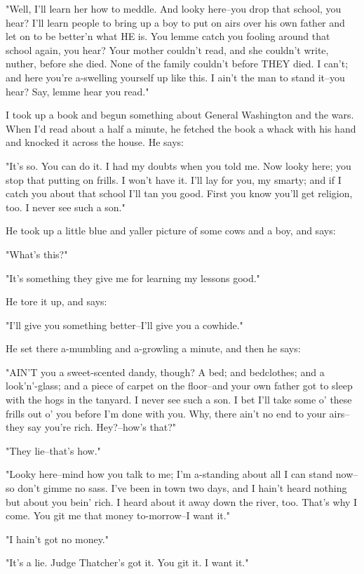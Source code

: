 "Well, I'll learn her how to meddle.  And looky here--you drop that
school, you hear?  I'll learn people to bring up a boy to put on airs
over his own father and let on to be better'n what HE is.  You lemme
catch you fooling around that school again, you hear?  Your mother
couldn't read, and she couldn't write, nuther, before she died.  None of
the family couldn't before THEY died.  I can't; and here you're
a-swelling yourself up like this.  I ain't the man to stand it--you hear?
Say, lemme hear you read."

I took up a book and begun something about General Washington and the
wars. When I'd read about a half a minute, he fetched the book a whack
with his hand and knocked it across the house.  He says:

"It's so.  You can do it.  I had my doubts when you told me.  Now looky
here; you stop that putting on frills.  I won't have it.  I'll lay for
you, my smarty; and if I catch you about that school I'll tan you good.
First you know you'll get religion, too.  I never see such a son."

He took up a little blue and yaller picture of some cows and a boy, and
says:

"What's this?"

"It's something they give me for learning my lessons good."

He tore it up, and says:

"I'll give you something better--I'll give you a cowhide."

He set there a-mumbling and a-growling a minute, and then he says:

"AIN'T you a sweet-scented dandy, though?  A bed; and bedclothes; and a
look'n'-glass; and a piece of carpet on the floor--and your own father
got to sleep with the hogs in the tanyard.  I never see such a son.  I
bet I'll take some o' these frills out o' you before I'm done with you.
Why, there ain't no end to your airs--they say you're rich.  Hey?--how's
that?"

"They lie--that's how."

"Looky here--mind how you talk to me; I'm a-standing about all I can
stand now--so don't gimme no sass.  I've been in town two days, and I
hain't heard nothing but about you bein' rich.  I heard about it away
down the river, too.  That's why I come.  You git me that money
to-morrow--I want it."

"I hain't got no money."

"It's a lie.  Judge Thatcher's got it.  You git it.  I want it."

